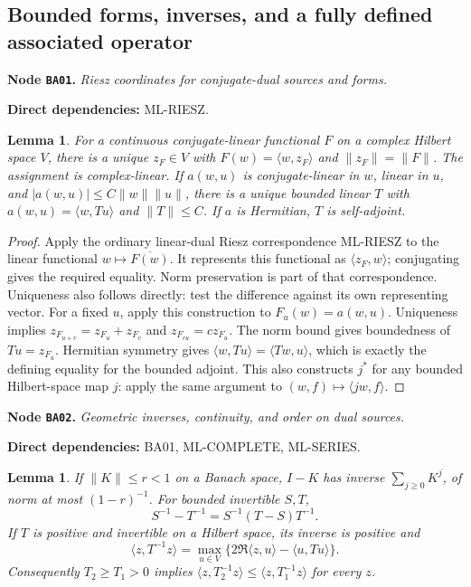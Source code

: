 \documentclass[11pt,a4paper]{article}
\newtheorem{lemma}[theorem]{Lemma}
\theoremstyle{remark}\newtheorem{remark}[theorem]{Remark}
\newcommand{\node}[3]{\par\Needspace{6\baselineskip}\smallskip\hypertarget{node:#1}{}\label{nodepage:#1}\noindent\textbf{Node \texttt{#1}.} \textit{#2.}\par\noindent\textbf{Direct dependencies:} #3.\par}
\begin{document}
\subsection{Bounded forms, inverses, and a fully defined associated operator}
\node{BA01}{Riesz coordinates for conjugate-dual sources and forms}{ML-RIESZ}
\begin{lemma}\label{lem:rieszcoordinates}
For a continuous conjugate-linear functional $F$ on a complex Hilbert space $V$, there is a unique $z_F\in V$ with $F(w)=\langle w,z_F\rangle$ and $\|z_F\|=\|F\|$. The assignment is complex-linear. If $a(w,u)$ is conjugate-linear in $w$, linear in $u$, and $|a(w,u)|\leq C\|w\|\|u\|$, there is a unique bounded linear $T$ with $a(w,u)=\langle w,Tu\rangle$ and $\|T\|\leq C$. If $a$ is Hermitian, $T$ is self-adjoint.
\end{lemma}
\begin{proof}
Apply the ordinary linear-dual Riesz correspondence ML-RIESZ to the linear functional $w\mapsto\overline{F(w)}$. It represents this functional as $\langle z_F,w\rangle$; conjugating gives the required equality. Norm preservation is part of that correspondence. Uniqueness also follows directly: test the difference against its own representing vector. For a fixed $u$, apply this construction to $F_u(w)=a(w,u)$. Uniqueness implies $z_{F_{u+v}}=z_{F_u}+z_{F_v}$ and $z_{F_{cu}}=cz_{F_u}$. The norm bound gives boundedness of $Tu=z_{F_u}$. Hermitian symmetry gives $\langle w,Tu\rangle=\langle Tw,u\rangle$, which is exactly the defining equality for the bounded adjoint. This also constructs $j^*$ for any bounded Hilbert-space map $j$: apply the same argument to $(w,f)\mapsto\langle jw,f\rangle$.
\end{proof}

\node{BA02}{Geometric inverses, continuity, and order on dual sources}{BA01, ML-COMPLETE, ML-SERIES}
\begin{lemma}\label{lem:inversecalculus}
If $\|K\|\leq r<1$ on a Banach space, $I-K$ has inverse $\sum_{j\geq0}K^j$, of norm at most $(1-r)^{-1}$. For bounded invertible $S,T$,
\[
 S^{-1}-T^{-1}=S^{-1}(T-S)T^{-1}.
\]
If $T$ is positive and invertible on a Hilbert space, its inverse is positive and
\[
 \langle z,T^{-1}z\rangle
 =\max_{u\in V}\{2\Re\langle z,u\rangle-\langle u,Tu\rangle\}.
\]
Consequently $T_2\geq T_1>0$ implies
$\langle z,T_2^{-1}z\rangle\leq\langle z,T_1^{-1}z\rangle$ for every $z$.
\end{lemma}
\end{document}
